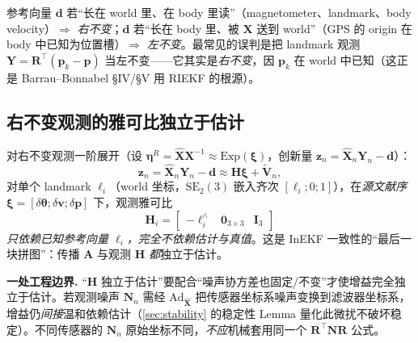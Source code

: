 \begin{insight}[记忆法则]
参考向量 $\mathbf{d}$ 若“长在 world 里、在 body 里读”（magnetometer、landmark、body velocity）$\Rightarrow$ \emph{右不变}；$\mathbf{d}$ 若“长在 body 里、被 $\mathbf{X}$ 送到 world”（GPS 的 origin 在 body 中已知为位置槽）$\Rightarrow$ \emph{左不变}。最常见的误判是把 landmark 观测 $\mathbf{Y}=\mathbf{R}^\top(\mathbf{p}_k-\mathbf{p})$ 当左不变——它其实是\emph{右不变}，因 $\mathbf{p}_k$ 在 world 中已知（这正是 Barrau--Bonnabel §IV/§V 用 RIEKF 的根源）。
\end{insight}

\subsection{右不变观测的雅可比独立于估计}
\label{subsec:H-independent}

对右不变观测一阶展开（设 $\boldsymbol{\eta}^R=\hat{\mathbf{X}}\mathbf{X}^{-1}\approx\mathrm{Exp}(\boldsymbol{\xi})$，创新量 $\mathbf{z}_n=\hat{\mathbf{X}}_n\mathbf{Y}_n-\mathbf{d}$）：
\begin{equation}
  \mathbf{z}_n=\hat{\mathbf{X}}_n\mathbf{Y}_n-\mathbf{d}\approx\mathbf{H}\boldsymbol{\xi}+\tilde{\mathbf{V}}_n,
  \label{eq:inekf-innov}
\end{equation}
对单个 landmark $\boldsymbol{\ell}_i$（world 坐标，$\mathrm{SE}_2(3)$ 嵌入齐次 $[\boldsymbol{\ell}_i;0;1]$），在\emph{源文献序} $\boldsymbol{\xi}=[\delta\boldsymbol{\theta};\delta\mathbf{v};\delta\mathbf{p}]$ 下，观测雅可比
\begin{equation}
  \mathbf{H}_i=\begin{bmatrix}-\boldsymbol{\ell}_i^\wedge&\mathbf{0}_{3\times3}&\mathbf{I}_3\end{bmatrix}
  \label{eq:inekf-H}
\end{equation}
\emph{只依赖已知参考向量 $\boldsymbol{\ell}_i$，完全不依赖估计与真值}\cite{barrau2017invariant}。这是 InEKF 一致性的“最后一块拼图”：传播 $\mathbf{A}$ 与观测 $\mathbf{H}$ \emph{都}独立于估计。

\begin{note}
\textbf{一处工程边界.}\;
“$\mathbf{H}$ 独立于估计”要配合“噪声协方差也固定/不变”才使增益完全独立于估计。若观测噪声 $\mathbf{N}_n$ 需经 $\mathrm{Ad}_{\hat{\mathbf{X}}}$ 把传感器坐标系噪声变换到滤波器坐标系，增益仍\emph{间接}温和依赖估计（\cref{sec:stability} 的稳定性 Lemma 量化此微扰不破坏稳定）。不同传感器的 $\mathbf{N}_n$ 原始坐标不同，\emph{不应}机械套用同一个 $\mathbf{R}^\top\mathbf{N}\mathbf{R}$ 公式。
\end{note}

